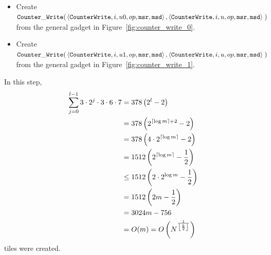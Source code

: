 \begin{itemize}
\begin{itemize}
            \item Create
            $\begin{aligned}[t]
                \cwrite(& \left\langle {\tt CounterWrite}, i, u0, \inc, {\tt msr}, {\tt msd} \right\rangle,
                          \left\langle {\tt CounterWrite}, i, u,  \inc, {\tt msr}, {\tt msd} \right\rangle \;)
            \end{aligned}$ \\ from the general gadget in Figure~\ref{fig:counter_write_0}.

            \item Create
            $\begin{aligned}[t]
                \cwrite(& \left\langle {\tt CounterWrite}, i,  u1, \inc, {\tt msr}, {\tt msd} \right\rangle,
                          \left\langle {\tt CounterWrite}, i,  u,  \inc, {\tt msr}, {\tt msd} \right\rangle \;)
            \end{aligned}$ \\ from the general gadget in Figure~\ref{fig:counter_write_1}.
    \end{itemize}

    In this step,
    \begin{align*}
        \sum_{j=0}^{l - 1} 3 \cdot 2^j \cdot 3 \cdot 6 \cdot 7 &=    378  \left( 2^{l} - 2                        \right) \\
                                                               &=    378  \left( 2^{\ceil*{\log m} + 2}     - 2   \right) \\
                                                               &=    378  \left( 4 \cdot 2^{\ceil*{\log m}} - 2   \right) \\
                                                               &=    1512 \left( 2^{\ceil*{\log m}} - \frac{1}{2} \right) \\
                                                               &\leq 1512 \left( 2 \cdot 2^{\log m} - \frac{1}{2} \right) \\
                                                               &=    1512 \left( 2m - \frac{1}{2}                 \right) \\
                                                               &=    3024m - 756                                          \\
                                                               &=    O(m) = O\left( \upperbound \right)                   \\
    \end{align*}
    tiles were created.


\end{itemize}
